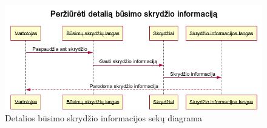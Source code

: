 \documentclass{VUMIFPSkursinis}
\begin{document}
\begin{enumerate}[label=\textbf{U\arabic*}.]
                    \begin{figure}[H]
                        \centering
                        \includegraphics[scale=0.8]{img/seqUpInfo}
                        \caption{Detalios būsimo skrydžio informacijos sekų diagrama}
                        \label{home_page_one_way}
                    \end{figure}
                    
                \end{enumerate}
      
\end{document}
